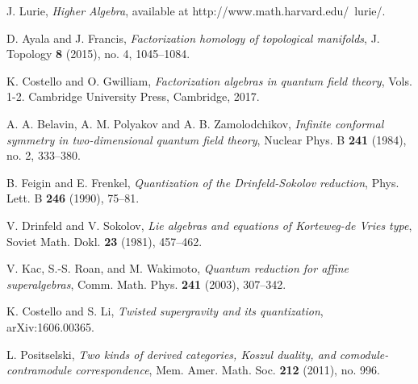 \begin{thebibliography}{99}
 J. Lurie, \emph{Higher Algebra}, available at http://www.math.harvard.edu/~lurie/.

 D. Ayala and J. Francis, \emph{Factorization homology of topological manifolds}, J. Topology \textbf{8} (2015), no. 4, 1045--1084.

 K. Costello and O. Gwilliam, \emph{Factorization algebras in quantum field theory}, Vols. 1-2. Cambridge University Press, Cambridge, 2017.

 A. A. Belavin, A. M. Polyakov and A. B. Zamolodchikov, \emph{Infinite conformal symmetry in two-dimensional quantum field theory}, Nuclear Phys. B \textbf{241} (1984), no. 2, 333--380.

 B. Feigin and E. Frenkel, \emph{Quantization of the Drinfeld-Sokolov reduction}, Phys. Lett. B \textbf{246} (1990), 75--81.

 V. Drinfeld and V. Sokolov, \emph{Lie algebras and equations of Korteweg-de Vries type}, Soviet Math. Dokl. \textbf{23} (1981), 457--462.

 V. Kac, S.-S. Roan, and M. Wakimoto, \emph{Quantum reduction for affine superalgebras}, Comm. Math. Phys. \textbf{241} (2003), 307--342.

 K. Costello and S. Li, \emph{Twisted supergravity and its quantization}, arXiv:1606.00365.

 L. Positselski, \emph{Two kinds of derived categories, Koszul duality, and comodule-contramodule correspondence}, Mem. Amer. Math. Soc. \textbf{212} (2011), no. 996.
 
\end{thebibliography}